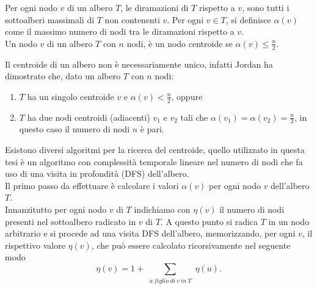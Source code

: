 
\begin{definizione}
Per ogni nodo $ v $ di un albero $ T $, le diramazioni di $ T $  rispetto a $ v $, sono tutti i sottoalberi massimali di $ T $ non contenenti $ v $. 
Per ogni $ v \in T $, si definisce $\alpha(v)$ come il massimo numero di nodi tra le diramazioni rispetto a $ v $.\\ %
Un nodo $ v $ di un albero $ T $ con $ n $ nodi, \`e un nodo centroide se $\alpha(v)\le\frac{n}{2}$.
\end{definizione}

Il centroide di un albero non \`e necessariamente unico, infatti Jordan \cite{jordan1869assemblages}  ha dimostrato che, dato un albero $ T $ con $ n $ nodi:
\begin{enumerate}
	\renewcommand{\labelenumi}{\roman{enumi}}
	\item $ T $ ha un singolo centroide $ v $ e $\alpha(v) < \frac{n}{2}$, oppure
	\item$ T $ ha due nodi centroidi (adiacenti) $v_1$ e $v_2$ tali che $\alpha(v_1) = \alpha(v_2) = \frac{n}{2}$, in questo caso il numero di nodi $ n $ \`e pari.
\end{enumerate}

Esistono diversi algoritmi per la ricerca del centroide, quello utilizzato in questa tesi \`e un algoritmo con complessit\`a temporale lineare nel numero di nodi che fa uso di una visita in profondità (DFS) dell'albero. \\
Il primo passo da effettuare \`e calcolare i valori $\alpha(v)$ per ogni nodo $ v$ dell'albero $T$.\\
Innanzitutto per ogni nodo $v$ di $T $ indichiamo con $ \eta(v) $ il numero di nodi presenti nel sottoalbero radicato in $ v $ di $ T $.
A questo punto si radica $T$ in un nodo arbitrario e si procede ad una visita DFS dell'albero, memorizzando, per ogni $v$, il rispettivo valore $ \eta(v) $, che può essere calcolato ricorsivamente nel seguente modo 
\begin{equation}
\label{eq:eta_centroide}
\eta(v) = 1 + \sum_{\substack{u \ figlio \ di \ v \ in \ T} } { \eta(u)}.
\end{equation}

